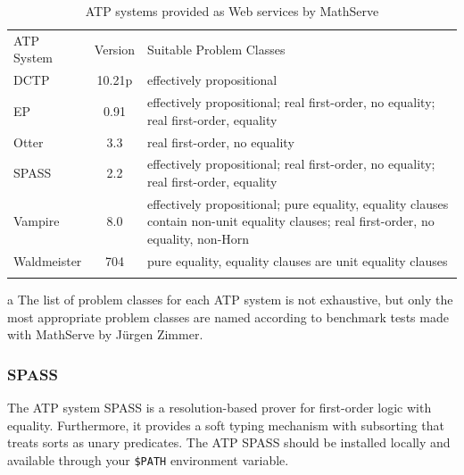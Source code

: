 \documentclass{article}
\newcommand{\normalTEXTSC}[2]{{#1\scriptsize#2}}
\newcommand     {\SPASS}{\normalTEXTSC{S}{PASS}\xspace}
\begin{document}
\begin{table}[t]
  \centering
  \begin{threeparttable}
    \begin{tabular}{|l|c|p{7cm}|}\firsthline
      ATP System & Version & Suitable Problem Classes\tnote{a}\\
      \hhline{|=|=|=|}
      DCTP & 10.21p & effectively propositional \\\hline
      EP & 0.91 & effectively propositional; real first-order, no
      equality; real first-order, equality\\\hline
      Otter & 3.3 & real first-order, no equality\\\hline
      \SPASS & 2.2 & effectively propositional; real first-order, no
      equality; real first-order, equality\\\hline
      Vampire & 8.0 & effectively propositional; pure equality, equality
      clauses contain non-unit equality clauses; real first-order, no
      equality, non-Horn\\\hline
      Waldmeister & 704 & pure equality, equality clauses are unit
      equality clauses\\\lasthline
    \end{tabular}
    \begin{tablenotes}\footnotesize
    \item[a]
      {The list of problem classes for each ATP system is not
        exhaustive, but only the most appropriate problem classes are
        named according to benchmark tests made with MathServe by
        J\"urgen Zimmer.}
    \end{tablenotes}
  \end{threeparttable}
  \caption{ATP systems provided as Web services by MathServe}
\vspace*{-4mm}
  \label{tab:MathServe}
\end{table}

\subsubsection*{\SPASS}

The ATP system \SPASS \cite{WeidenbachEtAl02} is a resolution-based
prover for first-order logic with equality. Furthermore, it provides a soft
typing mechanism with subsorting that treats sorts as unary
predicates. The ATP \SPASS should be installed locally and available
through your \verb,$PATH, environment variable.
\end{document}
